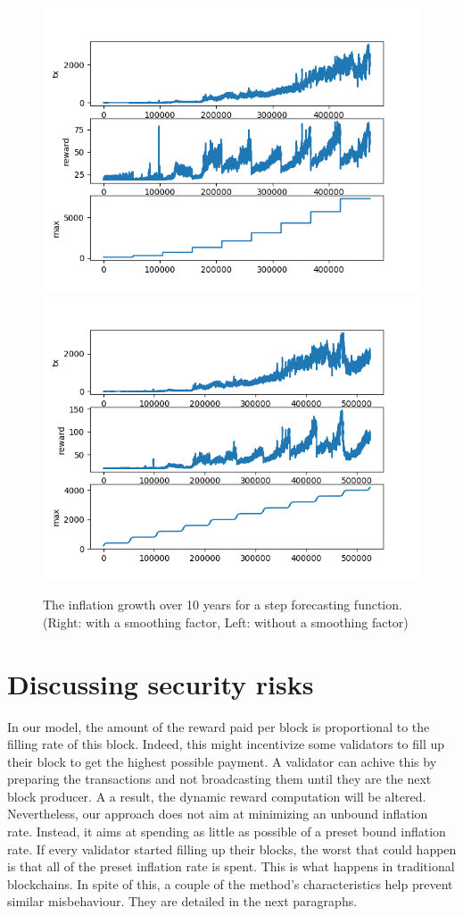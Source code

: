 \documentclass[conference]{IEEEtran}
\begin{document}
\begin{figure}[]
	\includegraphics[width=0.49\linewidth, trim= 0cm 0cm 0cm 0cm, clip]{Figures/Figure_steps.png}
	\includegraphics[width=0.49\linewidth, trim= 0cm 0cm 0cm 0cm, clip]{Figures/Figure_steps_smooth.png}
	\caption{The inflation growth over 10 years for a step forecasting function. (Right: with a smoothing factor, Left: without a smoothing factor)}
	\label{fig:sim}
\end{figure}

\section{Discussing security risks}
In our model, the amount of the reward paid per block is proportional to the filling rate of this block. Indeed, this might incentivize some validators to fill up their block to get the highest possible payment. A validator can achive this by preparing the transactions and not broadcasting them until they are the next block producer. A a result, the dynamic reward computation will be altered. Nevertheless, our approach does not aim at minimizing an unbound inflation rate. Instead, it aims at spending as little as possible of a preset bound inflation rate. If every validator started filling up their blocks, the worst that could happen is that all of the preset inflation rate is spent. This is what happens in traditional blockchains. In spite of this, a couple of the method's characteristics help prevent similar misbehaviour. They are detailed in the next paragraphs. 
\end{document}
